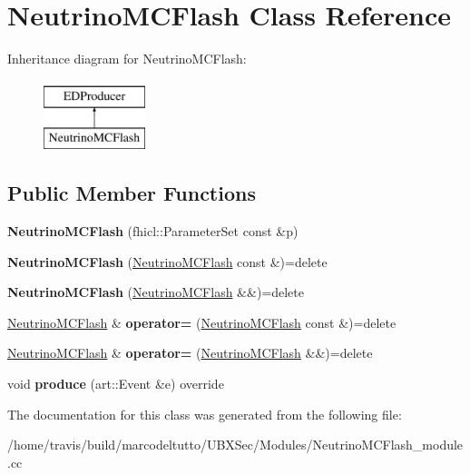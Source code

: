 \hypertarget{classNeutrinoMCFlash}{\section{Neutrino\-M\-C\-Flash Class Reference}
\label{classNeutrinoMCFlash}
}
Inheritance diagram for Neutrino\-M\-C\-Flash\-:\begin{figure}[H]
\begin{center}
\leavevmode
\includegraphics[height=2.000000cm]{classNeutrinoMCFlash}
\end{center}
\end{figure}
\subsection*{Public Member Functions}
\begin{DoxyCompactItemize}
\item 
\hypertarget{classNeutrinoMCFlash_a924c91e62abb544113c57f337b792da0}{{\bfseries Neutrino\-M\-C\-Flash} (fhicl\-::\-Parameter\-Set const \&p)}\label{classNeutrinoMCFlash_a924c91e62abb544113c57f337b792da0}

\item 
\hypertarget{classNeutrinoMCFlash_a1c2730ddb25b20ea1888ecab79b5d08b}{{\bfseries Neutrino\-M\-C\-Flash} (\hyperlink{classNeutrinoMCFlash}{Neutrino\-M\-C\-Flash} const \&)=delete}\label{classNeutrinoMCFlash_a1c2730ddb25b20ea1888ecab79b5d08b}

\item 
\hypertarget{classNeutrinoMCFlash_aaa3156265c398dcf28e2f89221010ba4}{{\bfseries Neutrino\-M\-C\-Flash} (\hyperlink{classNeutrinoMCFlash}{Neutrino\-M\-C\-Flash} \&\&)=delete}\label{classNeutrinoMCFlash_aaa3156265c398dcf28e2f89221010ba4}

\item 
\hypertarget{classNeutrinoMCFlash_a4473e1b794f33fde6aea4c741a5ebeda}{\hyperlink{classNeutrinoMCFlash}{Neutrino\-M\-C\-Flash} \& {\bfseries operator=} (\hyperlink{classNeutrinoMCFlash}{Neutrino\-M\-C\-Flash} const \&)=delete}\label{classNeutrinoMCFlash_a4473e1b794f33fde6aea4c741a5ebeda}

\item 
\hypertarget{classNeutrinoMCFlash_a13f1fc3b336ec7c9bd96983ec51b3e22}{\hyperlink{classNeutrinoMCFlash}{Neutrino\-M\-C\-Flash} \& {\bfseries operator=} (\hyperlink{classNeutrinoMCFlash}{Neutrino\-M\-C\-Flash} \&\&)=delete}\label{classNeutrinoMCFlash_a13f1fc3b336ec7c9bd96983ec51b3e22}

\item 
\hypertarget{classNeutrinoMCFlash_a96fff468ffb1b1182b296d9bdab6d31b}{void {\bfseries produce} (art\-::\-Event \&e) override}\label{classNeutrinoMCFlash_a96fff468ffb1b1182b296d9bdab6d31b}

\end{DoxyCompactItemize}


The documentation for this class was generated from the following file\-:\begin{DoxyCompactItemize}
\item 
/home/travis/build/marcodeltutto/\-U\-B\-X\-Sec/\-Modules/Neutrino\-M\-C\-Flash\-\_\-module.\-cc\end{DoxyCompactItemize}
